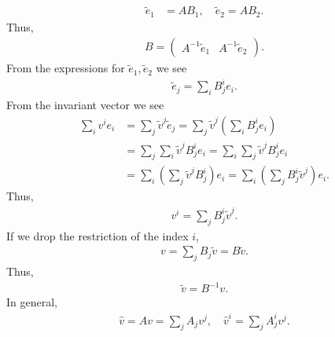 \documentclass{report}
\begin{document}
\begin{itemize}
            \begin{align*}
                \tilde{e}_{1} &= AB_{1}, \quad \tilde{e}_{2} = AB_{2}
            .\end{align*}
            Thus,
            \begin{align*}
                B = \begin{pmatrix} A^{-1}\tilde{e}_{1} & A^{-1}\tilde{e}_{2} \end{pmatrix}
            .\end{align*}
            From the expressions for $\tilde{e}_{1},\tilde{e}_{2}$ we see 
            \begin{align*}
                \tilde{e}_{j} = \sum_i B_{j}^{i}e_{i}
            .\end{align*}
            From the invariant vector we see
            \begin{align*}
                \sum_{i}v^{i}e_{i} &= \sum_{j}\tilde{v}^{j}\tilde{e}_{j} = \sum_j\tilde{v}^{j}\left(\sum_i B_{j}^{i}e_{i}\right) \\
                                   &= \sum_j\sum_i\tilde{v}^{j}B_{j}^{i}e_{i} = \sum_i\sum_j\tilde{v}^{j}B_{j}^{i}e_{i} \\
                                   &= \sum_i\left(\sum_j\tilde{v}^{j}B_{j}^{i}\right)e_{i} = \sum_i\left(\sum_jB_{j}^{i}\tilde{v}^{j}\right)e_{i}
            .\end{align*}
            Thus,
            \begin{align*}
                v^{i} = \sum_j B_j^{i}\tilde{v}^{j}
            .\end{align*}
            If we drop the restriction of the index $i$,
            \begin{align*}
                v = \sum_j B_j\tilde{v} = B\tilde{v}
            .\end{align*}
            Thus, 
            \begin{align*}
                \tilde{v}  = B^{-1}v
            .\end{align*}
            In general, 
            \begin{align*}
                \hat{v} = Av = \sum_j A_{j}v^{j}, \quad \hat{v}^{i} = \sum_j A_{j}^{i}v^{j}
            .\end{align*}



\end{itemize}
\end{document}
